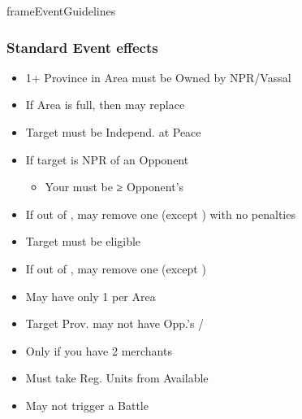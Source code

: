 \documentclass[10pt]{article}
\newlength{\fhEventGuidelines} \setlength\fhEventGuidelines{35.5\baselineskip}
\begin{document}
\begin{dynamiccontents*}{frameEventGuidelines}
\begin{eubox}{\fhEventGuidelines}
\begin{multicols*}{2}
		\subsubsection*{Standard Event effects }
		\begin{itemize}
			\item 1+ Province in Area must be Owned by NPR/Vassal
			\item If Area is full, then may replace \influence
		\end{itemize}
		\begin{itemize}
			\item Target must be Independ.  at Peace
			\item If target is NPR \ally of an Opponent
			\begin{itemize}
				\item Your \influence must be ≥ Opponent's \influence
			\end{itemize}
			\item If out of \alliances, may remove one (except \activeally) with no penalties
		\end{itemize}
		\begin{itemize}
			\item Target must be eligible
			\item If out of \marriages, may remove one (except \disputedsuccession)
		\end{itemize}
		\begin{itemize}
			\item May have only 1 per Area
		\end{itemize}
		\begin{itemize}
			\item Target Prov. may not have Opp.'s \town/\vassal
		\end{itemize}
		\begin{itemize}
			\item Only if you have 2 merchants
		\end{itemize}
		\begin{itemize}
			\item Must take Reg. Units from Available \manpower
			\item May not trigger a Battle
		\end{itemize}

\end{multicols*}
\end{eubox}
\end{dynamiccontents*}
\end{document}
